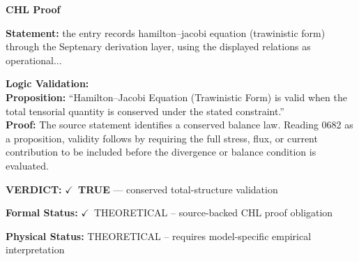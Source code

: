 \vspace{0.45em}
\noindent\textbf{CHL Proof}\par
\textbf{Statement:} the entry records hamilton--jacobi equation (trawinistic form) through the Septenary
derivation layer, using the displayed relations as operational...

\textbf{Logic Validation:}\\
\textbf{Proposition:} ``Hamilton--Jacobi Equation (Trawinistic Form) is valid when the total tensorial quantity
is conserved under the stated constraint.''\\
\textbf{Proof:} The source statement identifies a conserved balance law. Reading 0682 as a proposition,
validity follows by requiring the full stress, flux, or current contribution to be
included before the divergence or balance condition is evaluated.

\textbf{VERDICT:} \ensuremath{\checkmark}\ \textbf{TRUE} --- conserved total-structure validation

\textbf{Formal Status:} \ensuremath{\checkmark}\ THEORETICAL -- source-backed CHL proof obligation

\textbf{Physical Status:} THEORETICAL -- requires model-specific empirical interpretation
\par\vspace{0.45em}
\par
\ifTZPDarkEdition
{}
\fi
\endgroup
\endgroup
